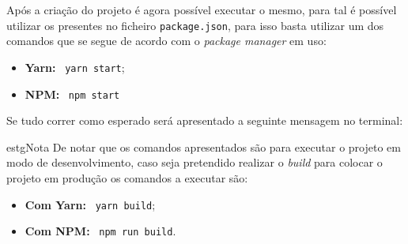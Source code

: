 Após a criação do projeto é agora possível executar o mesmo, para tal é possível utilizar os \textit{} presentes no ficheiro \texttt{package.json}, para isso basta utilizar um dos comandos que se segue de acordo com o \textit{package manager} em uso:

\begin{itemize}
	\item \textbf{Yarn:} ~\texttt{yarn start};
	\item \textbf{NPM:} ~\texttt{npm start}
\end{itemize}

Se tudo correr como esperado será apresentado a seguinte mensagem no terminal:


\begin{mybox}{estg}{Nota}
	De notar que os comandos apresentados são para executar o projeto em modo de desenvolvimento, caso seja pretendido realizar o \textit{build} para colocar o projeto em produção os comandos a executar são:

	\begin{itemize}
		\item \textbf{Com Yarn:} ~\texttt{yarn build};
		\item \textbf{Com NPM:} ~\texttt{npm run build}.
	\end{itemize}
\end{mybox}
